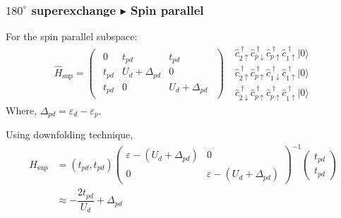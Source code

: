 \documentclass{beamer}
\begin{document}
  \begin{frame}
    \frametitle{\(180^{\circ}\) superexchange \(\blacktriangleright\) Spin parallel}
    For the spin parallel subspace:
    \begin{equation}
      \widehat{H}_{\text{sup}} = \begin{pmatrix}\begin{array}{c|cc}
        0 & t_{pd} & t_{pd}\\[0.5em]\hline
        t_{pd} & U_d + \Delta_{pd} & 0 \\[0.5em]
        t_{pd} & 0 & U_d + \Delta_{pd}
      \end{array}\end{pmatrix}\ \ \ \begin{matrix}
        \widehat{c}_{2\uparrow}^{\;\dagger}\widehat{c}_{p\downarrow}^{\;\dagger}\widehat{c}_{p\uparrow}^{\;\dagger}\widehat{c}_{1\uparrow}^{\;\dagger}|0\rangle\\
        \widehat{c}_{2\uparrow}^{\;\dagger}\widehat{c}_{p\uparrow}^{\;\dagger}\widehat{c}_{1\downarrow}^{\;\dagger}\widehat{c}_{1\uparrow}^{\;\dagger}|0\rangle\\
        \widehat{c}_{2\downarrow}^{\;\dagger}\widehat{c}_{p\uparrow}^{\;\dagger}\widehat{c}_{p\uparrow}^{\;\dagger}\widehat{c}_{1\uparrow}^{\;\dagger}|0\rangle
      \end{matrix}
    \end{equation}
    Where, \(\Delta_{pd} = \varepsilon_d - \varepsilon_p\).

    Using downfolding technique,
    \begin{equation}
      \begin{aligned}
        \widehat{H}_{\text{sup}} &= (t_{pd}, t_{pd})\begin{pmatrix}
          \varepsilon-(U_d + \Delta_{pd}) & 0\\
          0 & \varepsilon-(U_d + \Delta_{pd})
        \end{pmatrix}^{-1}\begin{pmatrix}
          t_{pd}\\
          t_{pd}
        \end{pmatrix}\\
        &\approx-\dfrac{2t_{pd}}{U_d} + \Delta_{pd}
      \end{aligned}
    \end{equation}
  \end{frame}
\end{document}
